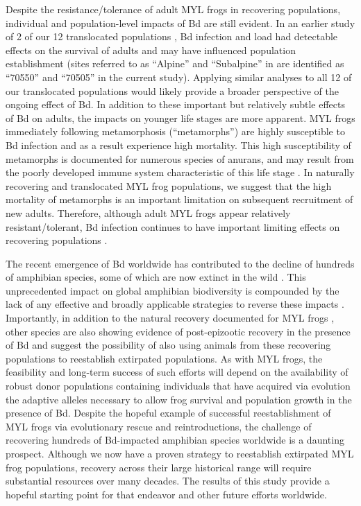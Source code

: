 \documentclass[9pt,twocolumn,twoside,lineno]{pnas-new}
\begin{document}
Despite the resistance/tolerance of adult MYL frogs in recovering
populations, individual and population-level impacts of Bd are still
evident. In an earlier study of 2 of our 12 translocated populations
\citep{joseph2018}, Bd infection and load had detectable effects on the
survival of adults and may have influenced population establishment
(sites referred to as ``Alpine'' and ``Subalpine'' in \citep{joseph2018}
are identified as ``70550'' and ``70505'' in the current study).
Applying similar analyses to all 12 of our translocated populations
would likely provide a broader perspective of the ongoing effect of Bd.
In addition to these important but relatively subtle effects of Bd on
adults, the impacts on younger life stages are more apparent. MYL frogs
immediately following metamorphosis (``metamorphs'') are highly
susceptible to Bd infection \citep{ellison2018} and as a result
experience high mortality. This high susceptibility of metamorphs is
documented for numerous species of anurans, and may result from the
poorly developed immune system characteristic of this life stage
\citep{humphries2022}. In naturally recovering and translocated MYL frog
populations, we suggest that the high mortality of metamorphs is an
important limitation on subsequent recruitment of new adults. Therefore,
although adult MYL frogs appear relatively resistant/tolerant, Bd
infection continues to have important limiting effects on recovering
populations \citep[see also][]{hollanders2022}.

The recent emergence of Bd worldwide has contributed to the decline of
hundreds of amphibian species, some of which are now extinct in the wild
\citep{scheele2019}. This unprecedented impact on global amphibian
biodiversity is compounded by the lack of any effective and broadly
applicable strategies to reverse these impacts
\citep{garner2016, knapp2022}. Importantly, in addition to the natural
recovery documented for MYL frogs \citep{knapp2016}, other species are
also showing evidence of post-epizootic recovery in the presence of Bd
\citep{scheele2017, voyles2018} and suggest the possibility of also
using animals from these recovering populations to reestablish
extirpated populations. As with MYL frogs, the feasibility and long-term
success of such efforts will depend on the availability of robust donor
populations containing individuals that have acquired via evolution the
adaptive alleles necessary to allow frog survival and population growth
in the presence of Bd. Despite the hopeful example of successful
reestablishment of MYL frogs via evolutionary rescue and
reintroductions, the challenge of recovering hundreds of Bd-impacted
amphibian species worldwide is a daunting prospect. Although we now have
a proven strategy to reestablish extirpated MYL frog populations,
recovery across their large historical range will require substantial
resources over many decades. The results of this study provide a hopeful
starting point for that endeavor and other future efforts worldwide.
\end{document}
